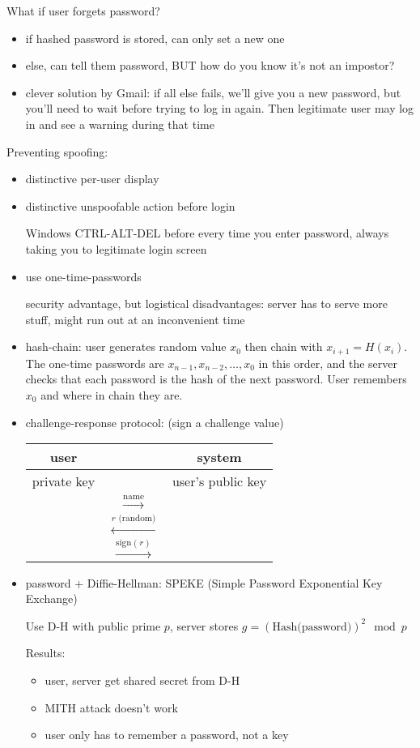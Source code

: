 What if user forgets password?
\begin{itemize}
    \item if hashed password is stored, can only set a new one
    \item else, can tell them password, BUT how do you know it's not an
            impostor?
    \item clever solution by Gmail: if all else fails, we'll give you a new
            password, but you'll need to wait before trying to log in again.
            Then legitimate user may log in and see a warning during that time
\end{itemize}

Preventing spoofing:
\begin{itemize}
    \item distinctive per-user display
    \item distinctive unspoofable action before login

        Windows CTRL-ALT-DEL before every time you enter password, always taking
        you to legitimate login screen
    \item use one-time-passwords

        security advantage, but logistical disadvantages: server has to serve
        more stuff, might run out at an inconvenient time
    \item hash-chain: user generates random value $x_0$ then chain with
        $x_{i+1} = H(x_i)$. The one-time passwords are
        $x_{n-1}, x_{n-2}, \dots, x_0$ in this order, and the server checks that
        each password is the hash of the next password. User remembers $x_0$
        and where in chain they are.
    \item challenge-response protocol: (sign a challenge value)
        \begin{table}\centering\begin{tabular}{ccc}
            user & & system\\
            \hline
            private key & & user's public key\\
            & $\xrightarrow{\text{name}}$ & \\
            & $\xleftarrow{r \text{ (random)}}$ & \\
            & $\xrightarrow{\text{sign} (r)}$ &
        \end{tabular}\end{table}
    \item password + Diffie-Hellman: SPEKE (Simple Password Exponential Key
            Exchange)

        Use D-H with public prime $p$, server stores
        $g = (\text{Hash(password)})^2 \mod p$

        Results:
        \begin{itemize}
            \item user, server get shared secret from D-H
            \item MITH attack doesn't work
            \item user only has to remember a password, not a key
        \end{itemize}
\end{itemize}
